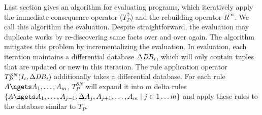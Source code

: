 \def\UF{\textit{UF}}



\def\SN{\mathit{SN}}
\def\N{\mathit{N}}

Last section gives an algorithm for evaluating \egglog programs, 
 which iteratively apply the immediate consequence operator ($T^\uparrow_P$)
 and the rebuilding operator $R^\infty$.
We call this algorithm the \naive evaluation.
Despite straightforward,
 the \naive evaluation may duplicate works by re-discovering same facts
 over and over again.
The \seminaive algorithm mitigates this problem 
 by incrementalizing the evaluation.
In \seminaive evaluation, each iteration maintains a differential database $\Delta\mathit{DB}_i$,
 which will only contain tuples that are updated or new in this iteration.
The \seminaive rule application operator $T^\SN_P(I_i, \Delta\DB_i)$ 
 additionally takes a differential database.
For each rule $A\ngets A_1, \ldots, A_m$, $T^\SN_P$ will expand it
 into $m$ delta rules 
 $\{A \ngets A_1, \ldots, A_{j-1}, \Delta A_j, A_{j+1}, \ldots, A_m \mid j \in 1\ldots m\}$
 and apply these rules to the database similar to $T_P$.

